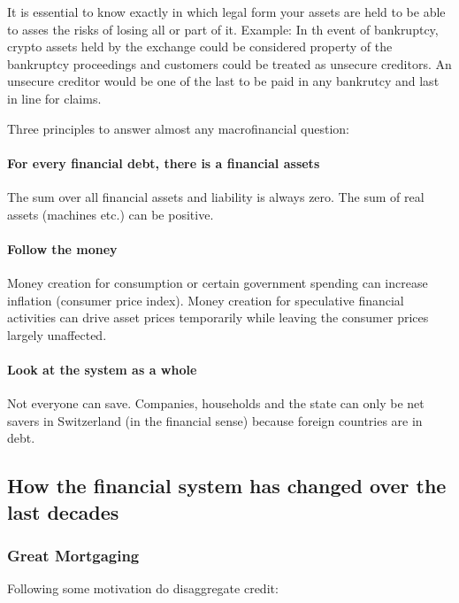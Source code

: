 \documentclass[a4paper]{extarticle}
\begin{document}
It is essential to know exactly in which legal form your assets are held to be able to asses the risks of losing all or part of it. Example: In th event of bankruptcy, crypto assets held by the exchange could be considered property of the bankruptcy proceedings and customers could be treated as unsecure creditors. An unsecure creditor would be one of the last to be paid in any bankrutcy and last in line for claims.

Three principles to answer almost any macrofinancial question:

\paragraph{For every financial debt, there is a financial assets} The sum over all financial assets and liability is always zero. The sum of real assets (machines etc.) can be positive.

\paragraph{Follow the money} Money creation for consumption or certain government spending can increase inflation (consumer price index). Money creation for speculative financial activities can drive asset prices temporarily while leaving the consumer prices largely unaffected.

\paragraph{Look at the system as a whole} Not everyone can save. Companies, households and the state can only be net savers in Switzerland (in the financial sense) because foreign countries are in debt.

\subsection{How the financial system has changed over the last decades}

\subsubsection{Great Mortgaging}

Following some motivation do disaggregate credit:
\end{document}
